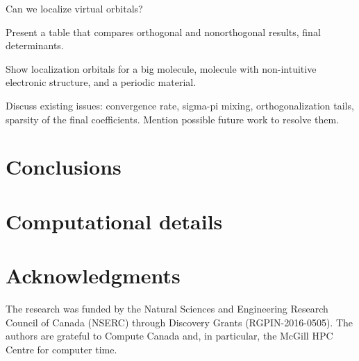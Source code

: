 \documentclass[aps,prl,reprint,amsmath,amssymb]{revtex4-1}
\begin{document}
Can we localize virtual orbitals?

Present a table that compares orthogonal and nonorthogonal results, final determinants.

Show localization orbitals for a big molecule, molecule with non-intuitive electronic structure, and a periodic material.

Discuss existing issues: convergence rate, sigma-pi mixing, orthogonalization tails, sparsity of the final coefficients. Mention possible future work to resolve them.

\section{Conclusions}


\section{Computational details}


\section{Acknowledgments} 

The research was funded by the Natural Sciences and Engineering Research Council of Canada (NSERC) through Discovery
Grants (RGPIN-2016-0505). The authors are grateful to Compute Canada and, in particular, the McGill HPC Centre for computer time.



\end{document}
